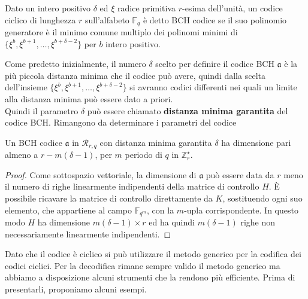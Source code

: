 \begin{definizione}
   Dato un intero positivo $\delta$ ed $\xi$ radice primitiva $r$-esima dell'unità, un codice ciclico di lunghezza $r$ sull'alfabeto $\mathbb{F}_{q}$ è detto BCH codice se il suo polinomio generatore è il minimo comune multiplo dei polinomi minimi di $\lbrace \xi^{b}, \xi^{b+1}, \dots,\xi^{b + \delta -2} \rbrace $ per $b$ intero positivo.
\end{definizione}
\noindent
Come predetto inizialmente, il numero $\delta$ scelto per definire il codice BCH $\mathfrak{a}$ è la più piccola distanza minima che il codice può avere, quindi dalla scelta dell'insieme $\lbrace \xi^{b}, \xi^{b+1}, \dots,\xi^{b + \delta -2} \rbrace $ si avranno codici differenti nei quali un limite alla distanza minima può essere dato a priori. \\
Quindi il parametro $\delta$ può essere chiamato {\bf distanza minima garantita} del codice BCH.
Rimangono da determinare i parametri del codice
 \begin{teorema}
    Un BCH codice $\mathfrak{a}$ in $\mathcal{R}_{r, q}$ con distanza minima garantita $\delta$ ha dimensione pari almeno a $r - m(\delta -1)$, per $m$ periodo di $q$ in $\mathbb{Z}_{r}^{\star}$.
 \end{teorema}
 \begin{proof}
    Come sottospazio vettoriale, la dimensione di $\mathfrak{a}$ può essere data da $r$ meno il numero di righe linearmente indipendenti della matrice di controllo $H$. È possibile ricavare la matrice di controllo direttamente da $K$, sostituendo ogni suo elemento, che appartiene al campo $\mathbb{F}_{q^m}$, con la $m$-upla corrispondente. In questo modo $H$ ha dimensione $m(\delta-1)\times r$ ed ha quindi $m(\delta-1)$ righe non necessariamente linearmente indipendenti. 
 \end{proof}

Dato che il codice è ciclico si può utilizzare il metodo generico per la codifica dei codici ciclici. Per la decodifica rimane sempre valido il metodo generico ma abbiamo a disposizione alcuni strumenti che la rendono più efficiente. Prima di presentarli, proponiamo alcuni esempi.

